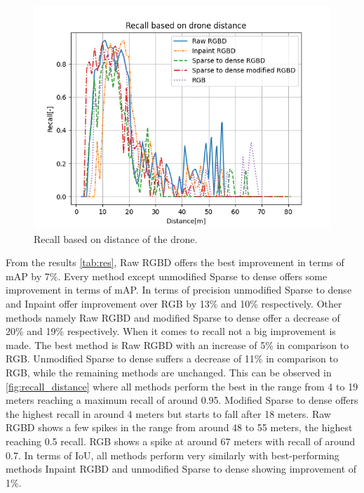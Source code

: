 \documentclass[twoside]{ctuthesis}
\theoremstyle{plain}
\theoremstyle{definition}
\theoremstyle{note}
\begin{document}
\begin{figure}
	\centering
	\includegraphics[width=\textwidth]{recall_distance.png}
	\caption{Recall based on distance of the drone.} \label{fig:recall_distance}
\end{figure}
From the results \ref{tab:res}, Raw RGBD offers the best improvement in terms of mAP by 7\%. Every method except unmodified Sparse to dense offers some improvement in terms of mAP. In terms of precision unmodified Sparse to dense and Inpaint offer improvement over RGB by 13\% and 10\% respectively. Other methods namely Raw RGBD and modified Sparse to dense offer a decrease of 20\% and 19\% respectively. When it comes to recall not a big improvement is made. The best method is Raw RGBD with an increase of 5\% in comparison to RGB. Unmodified Sparse to dense suffers a decrease of 11\% in comparison to RGB, while the remaining methods are unchanged. This can be observed in \autoref{fig:recall_distance} where all methods perform the best in the range from 4 to 19 meters reaching a maximum recall of around 0.95. Modified Sparse to dense offers the highest recall in around 4 meters but starts to fall after 18 meters. Raw RGBD shows a few spikes in the range from around 48 to 55 meters, the highest reaching 0.5 recall. RGB shows a spike at around 67 meters with recall of around 0.7. In terms of IoU, all methods perform very similarly with best-performing methods Inpaint RGBD and unmodified Sparse to dense showing improvement of 1\%.
\end{document}
